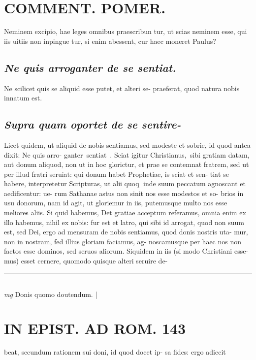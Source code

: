 \documentclass{article}
\begin{document}
\begin{pages}
\section*{COMMENT. POMER.  }\pstart Neminem excipio, hae leges omnibus praescribun tur, ut scias neminem esse, qui iis uitiis non inpingue tur, si enim abessent, cur haec moneret Paulus?  \pend
{}
{}
\subsection*{\textit{Ne quis arroganter de se sentiat. }}\pstart Ne scilicet quis se aliquid esse putet, et alteri se- praeferat, quod natura nobis innatum est.   \pend
{}
{}
\subsection*{\textit{Supra quam oportet de se sentire- }}\pstart Licet quidem, ut aliquid de nobis sentiamus, sed modeste et sobrie, id quod antea dixit: Ne quis arro- ganter sentiat . Sciat igitur Christianus, sibi gratiam datam, aut donum aliquod, non ut in hoc glorictur, et prae se contemnat fratrem, sed ut per illud fratri seruiat: qui donum habet Prophetiae, is sciat et sen- tiat se habere, interpretetur Scripturas, ut alii quoq inde suum peccatum agnoscant et aedificentur: ue- rum Sathanae astus non sinit nos esse modestos et so- brios in usu donorum, nam id agit, ut gloriemur in iis, putemusque multo nos esse meliores aliis. Si quid habemus, Det gratiae acceptum referamus, omnia enim ex illo habemus, nihil ex nobis: fur est et latro, qui sibi id arrogat, quod non suum est, sed Dei, ergo ad mensuram de nobis sentiamus, quod donis nostris uta- mur, non in nostram, fed illius gloriam faciamus, ag- noscamusque per haec nos non factos esse dominos, sed seruos aliorum. Siquidem in iis (si modo Christiani esse- mus) esset cernere, quomodo quisque alteri seruire de-  \pend
\vspace{0.5cm}\noindent
\vspace{0.2cm}\rule{1cm}{0.2pt}\\ 
\hspace{0.2cm}\textit{mg}
\footnotesize Donis quomo doutendum.  
\normalsize| 
\section*{IN EPIST. AD ROM.  143 }
\marginpar{[ p.]}\pstart beat, secundum rationem sui doni, id quod docet ip- sa fides: ergo adiecit  \pend
{}
{}

\end{pages}
\end{document}
